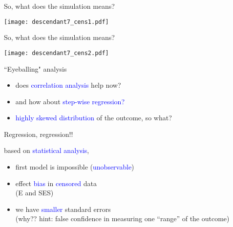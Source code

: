 %
%
\begin{frame}
	{So, what does the simulation means?}
	
	\begin{figure*}
		\texttt{[image: descendant7\_cens1.pdf]}
	\end{figure*}
\end{frame}
%
%
\begin{frame}
	{So, what does the simulation means?}
	
	\begin{figure*}
		\texttt{[image: descendant7\_cens2.pdf]}
	\end{figure*}
\end{frame}
%
%
\begin{lhframe}[rhgraphic={\texttt{[image: descendant7\_panel.pdf]}}]
	{``Eyeballing" analysis}
	
	\begin{itemize}
		\item does \textcolor{blue}{correlation analysis} help now?
		\item and how about \textcolor{blue}{step-wise regression?} \\
		\item \textcolor{blue}{highly skewed distribution} of the outcome, so what?
	\end{itemize}
	
\end{lhframe}
%
%
\begin{lhframe}[rhgraphic={\texttt{[image: descendant7\_reg.png]}}]
	{Regression, regression!!}
	
	based on \textcolor{blue}{statistical analysis},
	\begin{itemize}
		\item first model is impossible (\textcolor{blue}{unobservable})
		\item effect \textcolor{blue}{bias} in \textcolor{blue}{censored} data \\
		(E and SES)
		\item we have \textcolor{blue}{smaller} standard errors \\
		{\small (why?? hint: false confidence in measuring one ``range'' of the outcome)}
	\end{itemize}
\end{lhframe}
%
%
